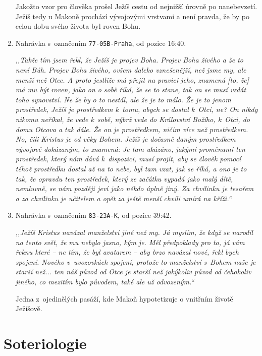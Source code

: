 \begin{enumerate}
{Jakožto vzor pro člověka prošel Ježíš cestu od nejnižší úrovně po nanebevzetí.
        Ježíš tedy u Makoně prochází vývojovými vrstvami a není pravda, že by po
        celou dobu svého života byl roven Bohu.

}

\item{
Nahrávka s~označením \texttt{77-05B-Praha}, od pozice 16:40.

\textit{%
,,Takže tím jsem řekl, že Ježíš je projev Boha. Projev Boha živého a že to
není Bůh. Projev Boha živého, ovšem daleko vznešenější, než jsme my, ale menší
než Otec. A proto jestliže má přejít na pravici jeho, znamená [to, že] má mu být
roven, jako on o sobě říká, že se to stane, tak on se musí vzdát toho synovství.
Ne že by o to nestál, ale že je to
málo. Že je to jenom prostředek, Ježíš je prostředkem k~tomu, abych se dostal
k~Otci, ne? On nikdy
nikomu neříkal, že vede k~sobě, nýbrž vede do Království Božího, k~Otci, do domu Otcova a
tak dále. Že on je prostředkem, ničím více než prostředkem. No, čili Kristus je
od věky Bohem.
Ježíš je dočasně daným prostředkem vývojově dokázaným, to znamená: Je tam
ukázáno,
jakými proměnami ten prostředek, který nám dává k~dispozici, musí projít, aby se
člověk pomocí téhož prostředku dostal až na to nebe, byl tam  vzat, jak se říká, a ono je
to tak, že opravdu ten prostředek, který ze začátku vypadá jako malý dítě,
nemluvně, se
nám později jeví jako někdo úplně jiný. Za chvilinku je tesařem a za chvilinku je
učitelem a opět za ještě menší chvíli umírá na kříži.``
}
}

\item{
Nahrávka s~označením \texttt{83-23A-K}, od pozice 39:42.

\textit{%
,,Ježíš Kristus navázal manželství jiné než my. Já myslím, že když se narodil na
tento svět, že mu nebylo jasno, kým je. Měl předpoklady pro to, já vám řeknu
které -- ne tím, že byl avatarem -- aby brzo navázal nové, řekl bych spojení.
Nového v~uvozovkách spojení, protože to manželství s~Bohem naše je starší než...
ten náš původ od Otce je starší než jakýkoliv původ od čehokoliv jiného, co
mezitím bylo původem, také ale už odvozeným.``
}

Jedna z~ojedinělých pasáží, kde Makoň hypotetizuje o vnitřním životě Ježíšově.

}

\end{enumerate}

\section{Soteriologie}

